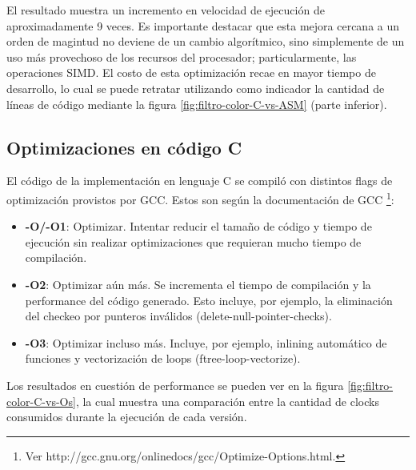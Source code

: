 El resultado muestra un incremento en velocidad de ejecución de aproximadamente 9 veces. Es importante destacar que esta mejora cercana a un orden de magintud no deviene de un cambio algorítmico, sino simplemente de un uso más provechoso de los recursos del procesador; particularmente, las operaciones SIMD. El costo de esta optimización recae en mayor tiempo de desarrollo, lo cual se puede retratar utilizando como indicador la cantidad de líneas de código mediante la figura \ref{fig:filtro-color-C-vs-ASM} (parte inferior).


\subsection{Optimizaciones en código C}
\label{sub:filtro-color-optimizaciones-c}

El código de la implementación en lenguaje C se compiló con distintos flags de optimización provistos por GCC. Estos son según la documentación de GCC \footnote{Ver http://gcc.gnu.org/onlinedocs/gcc/Optimize-Options.html.}:

\begin{itemize}
\item \textbf{-O/-O1}: Optimizar. Intentar reducir el tamaño de código y tiempo de ejecución sin realizar optimizaciones que requieran mucho tiempo de compilación.
\item \textbf{-O2}: Optimizar aún más. Se incrementa el tiempo de compilación y la performance del código generado. Esto incluye, por ejemplo, la eliminación del checkeo por punteros inválidos (delete-null-pointer-checks).
\item \textbf{-O3}: Optimizar incluso más. Incluye, por ejemplo, inlining automático de funciones y vectorización de loops (ftree-loop-vectorize).
\end{itemize}

Los resultados en cuestión de performance se pueden ver en la figura \ref{fig:filtro-color-C-vs-Os}, la cual muestra una comparación entre la cantidad de clocks consumidos durante la ejecución de cada versión.

